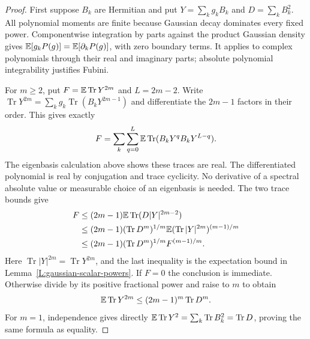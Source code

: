 \begin{proof}
  First suppose $B_k$ are Hermitian and put $Y=\sum_k g_kB_k$ and
  $D=\sum_k B_k^2$. All polynomial moments are finite because Gaussian
  decay dominates every fixed power. Componentwise integration by parts
  against the product Gaussian density gives
  $\mathbb{E}[g_kP(g)]=\mathbb{E}[\partial_kP(g)]$, with zero boundary terms. It applies
  to complex polynomials through their real and imaginary parts; absolute
  polynomial integrability justifies Fubini.

  For $m \ge 2$, put $F=\mathbb{E}\operatorname{Tr}Y^{2m}$ and $L=2m-2$.
  Write $\operatorname{Tr}Y^{2m}=\sum_k g_k
  \operatorname{Tr}(B_kY^{2m-1})$ and differentiate the $2m-1$ factors
  in their order. This gives exactly
  \[
    F=\sum_k\sum_{q=0}^{L}
    \mathbb{E}\operatorname{Tr}(B_kY^qB_kY^{L-q}).
  \]
  The eigenbasis calculation above shows these traces are real.
  The differentiated polynomial is real by conjugation and trace cyclicity.
  No derivative of a spectral absolute value or measurable choice of an
  eigenbasis is needed. The two trace bounds give
  \begin{align*}
    F&\le (2m-1)\mathbb{E}\operatorname{Tr}(D|Y|^{2m-2})\\
    &\le (2m-1)(\operatorname{Tr}D^m)^{1/m}
    \mathbb{E}(\operatorname{Tr}|Y|^{2m})^{(m-1)/m}\\
    &\le (2m-1)(\operatorname{Tr}D^m)^{1/m}F^{(m-1)/m}.
  \end{align*}
  Here $\operatorname{Tr}|Y|^{2m}=\operatorname{Tr}Y^{2m}$, and the last
  inequality is the expectation bound in Lemma~\ref{L:gaussian-scalar-powers}.
  If $F=0$ the conclusion is immediate. Otherwise divide by its positive
  fractional power and raise to $m$ to obtain
  \begin{equation}\label{E:finite-hermitian-gaussian}
    \mathbb{E}\operatorname{Tr}Y^{2m} \le (2m-1)^m\operatorname{Tr}D^m.
  \end{equation}
  For $m=1$, independence gives directly
  $\mathbb{E}\operatorname{Tr}Y^2=\sum_k\operatorname{Tr}B_k^2
  =\operatorname{Tr}D$, proving the same formula as equality.


\end{proof}
